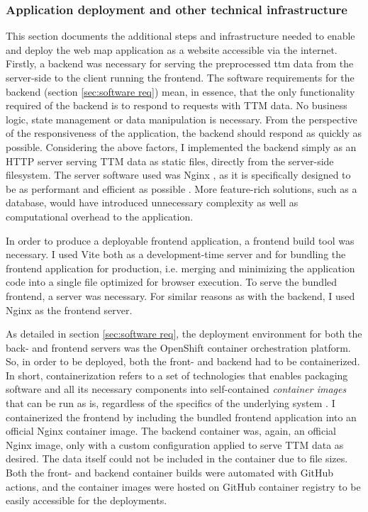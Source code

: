 \subsubsection{Application deployment and other technical infrastructure}

This section documents the additional steps and infrastructure
needed to enable and deploy the web map application as
a website accessible via the internet.
Firstly,
a backend was necessary for serving the preprocessed \acrshort{ttm} data
from the server-side to the client running the frontend.
The software requirements for the backend
(section \ref{sec:software req}) mean, in essence,
that the only functionality required of the backend
is to respond to requests with TTM data.
No business logic, state management or data manipulation is necessary.
From the perspective of the responsiveness of the application,
the backend should respond as quickly as possible.
Considering the above factors,
I implemented the backend
simply as an HTTP server serving TTM data as static files,
directly from the server-side filesystem.
The server software used was Nginx \parencite{nginx},
as it is specifically designed to be as performant and efficient as possible
\parencite{dej2020, ree2008}.
More feature-rich solutions, such as a database,
would have introduced unnecessary complexity
as well as computational overhead to the application.

In order to produce a deployable frontend application,
a frontend build tool was necessary.
I used Vite \parencite{vite} both as a development-time server
and for bundling the frontend application for production,
i.e. merging and minimizing the application code into
a single file optimized for browser execution.
To serve the bundled frontend, a server was necessary.
For similar reasons as with the backend,
I used Nginx \parencite{nginx} as the frontend server.

As detailed in section \ref{sec:software req},
the deployment environment for both the back- and frontend
servers was the OpenShift container orchestration platform.
So, in order to be deployed, both the front- and backend had to be containerized.
In short, containerization refers to a set of technologies
that enables packaging software and all its necessary components
into self-contained \textit{container images} that can be run as is,
regardless of the specifics of the underlying system \parencite{ben2022}.
I containerized the frontend by including the bundled
frontend application into an official Nginx container image.
The backend container was, again, an official Nginx image,
only with a custom configuration applied to serve TTM data as desired.
The data itself could not be included in the container due to file sizes.
Both the front- and backend container builds were automated with GitHub actions,
and the container images were hosted on GitHub container registry
to be easily accessible for the deployments.

